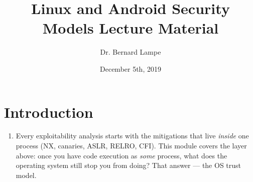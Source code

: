 \documentclass[12pt]{Training}
\title{Linux and Android Security Models Lecture Material}
\author{Dr. Bernard Lampe}
\date{December 5th, 2019}
\begin{document}
\maketitle


\section*{Introduction}
\begin{enumerate}
    \item Every exploitability analysis starts with the mitigations that live \emph{inside} one process (NX, canaries, ASLR, RELRO, CFI). This module covers the layer above: once you have code execution as \emph{some} process, what does the operating system still stop you from doing? That answer --- the OS trust model.
\end{enumerate}
\end{document}
